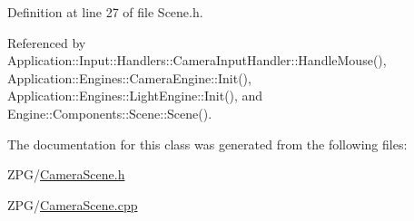 Definition at line 27 of file Scene.\+h.



Referenced by Application\+::\+Input\+::\+Handlers\+::\+Camera\+Input\+Handler\+::\+Handle\+Mouse(), Application\+::\+Engines\+::\+Camera\+Engine\+::\+Init(), Application\+::\+Engines\+::\+Light\+Engine\+::\+Init(), and Engine\+::\+Components\+::\+Scene\+::\+Scene().



The documentation for this class was generated from the following files\+:\begin{DoxyCompactItemize}
\item 
Z\+P\+G/\mbox{\hyperlink{CameraScene_8h}{Camera\+Scene.\+h}}\item 
Z\+P\+G/\mbox{\hyperlink{CameraScene_8cpp}{Camera\+Scene.\+cpp}}\end{DoxyCompactItemize}
